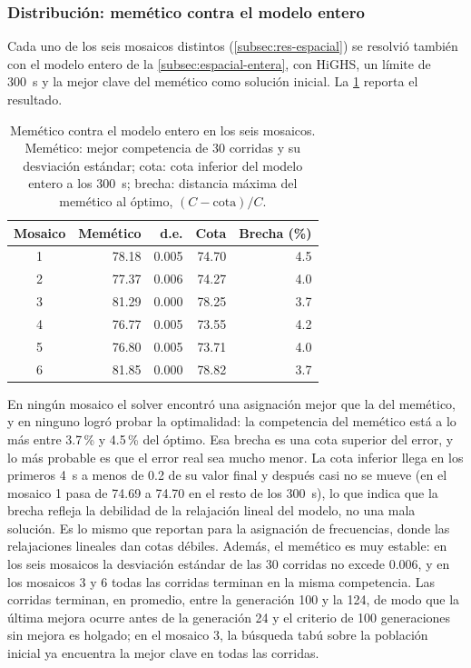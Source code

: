 \subsubsection{Distribución: memético contra el modelo entero}
\label{subsec:val-espacial}

Cada uno de los seis mosaicos distintos (\cref{subsec:res-espacial}) se resolvió también con el modelo entero de la \cref{subsec:espacial-entera}, con HiGHS, un límite de 300~s y la mejor clave del memético como solución inicial. La \cref{tab:val-espacial} reporta el resultado.

\begin{table}[t]
\centering
\caption{Memético contra el modelo entero en los seis mosaicos. Memético: mejor competencia de 30 corridas y su desviación estándar; cota: cota inferior del modelo entero a los 300~s; brecha: distancia máxima del memético al óptimo, $(C-\text{cota})/C$.}
\label{tab:val-espacial}
\small
\begin{tabular}{@{}crrrr@{}}
\toprule
Mosaico & Memético & d.e. & Cota & Brecha (\%) \\
\midrule
1 & 78.18 & 0.005 & 74.70 & 4.5 \\
2 & 77.37 & 0.006 & 74.27 & 4.0 \\
3 & 81.29 & 0.000 & 78.25 & 3.7 \\
4 & 76.77 & 0.005 & 73.55 & 4.2 \\
5 & 76.80 & 0.005 & 73.71 & 4.0 \\
6 & 81.85 & 0.000 & 78.82 & 3.7 \\
\bottomrule
\end{tabular}
\end{table}

En ningún mosaico el solver encontró una asignación mejor que la del memético, y en ninguno logró probar la optimalidad: la competencia del memético está a lo más entre 3.7\,\% y 4.5\,\% del óptimo. Esa brecha es una cota superior del error, y lo más probable es que el error real sea mucho menor. La cota inferior llega en los primeros 4~s a menos de 0.2 de su valor final y después casi no se mueve (en el mosaico 1 pasa de 74.69 a 74.70 en el resto de los 300~s), lo que indica que la brecha refleja la debilidad de la relajación lineal del modelo, no una mala solución. Es lo mismo que \textcite{eisenblatter2002} reportan para la asignación de frecuencias, donde las relajaciones lineales dan cotas débiles. Además, el memético es muy estable: en los seis mosaicos la desviación estándar de las 30 corridas no excede 0.006, y en los mosaicos 3 y 6 todas las corridas terminan en la misma competencia. Las corridas terminan, en promedio, entre la generación 100 y la 124, de modo que la última mejora ocurre antes de la generación 24 y el criterio de 100 generaciones sin mejora es holgado; en el mosaico 3, la búsqueda tabú sobre la población inicial ya encuentra la mejor clave en todas las corridas.
